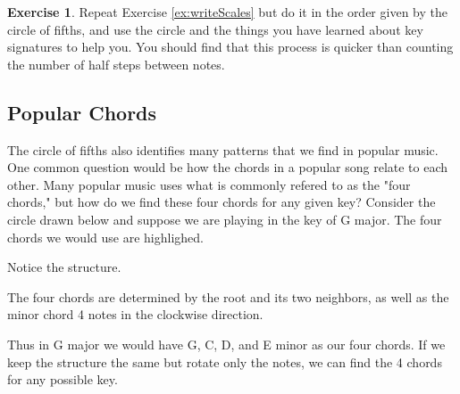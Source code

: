\documentclass[12pt]{article}
\theoremstyle{definition}
\newtheorem{exercise}{Exercise}
\begin{document}
\begin{exercise}
Repeat Exercise \ref{ex:writeScales} but do it in the order given by the circle of fifths, and use the circle and the things you have learned about key signatures to help you. You should find that this process is quicker than counting the number of half steps between notes. 
\end{exercise}

\subsection*{Popular Chords}
The circle of fifths also identifies many patterns that we find in popular music. One common question would be how the chords in a popular song relate to each other. Many popular music uses what is commonly refered to as the "four chords," but how do we find these four chords for any given key? Consider the circle drawn below and suppose we are playing in the key of G major. The four chords we would use are highlighed.

\begin{center}
\end{center}

Notice the structure. 
\begin{center}
    The four chords are determined by the root and its two neighbors, as well as the minor chord 4 notes in the clockwise direction.
\end{center} 
Thus in G major we would have G, C, D, and E minor as our four chords. 
If we keep the structure the same but rotate only the notes, we can find the 4 chords for any possible key. 
\end{document}
